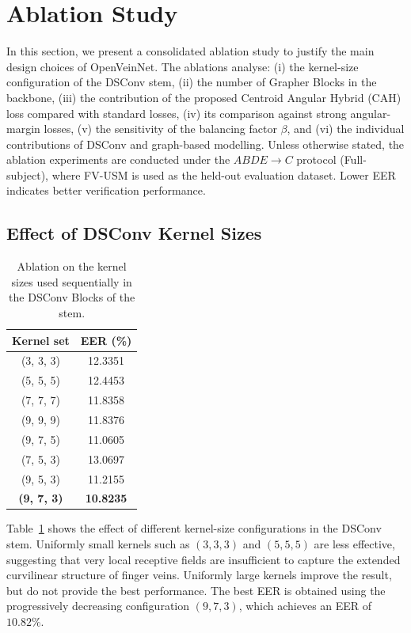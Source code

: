 \documentclass[10pt,journal,compsoc]{IEEEtran}
\begin{document}
\section{Ablation Study}
\label{sec:ablation}

In this section, we present a consolidated ablation study to justify the main design choices of OpenVeinNet. The ablations analyse: (i) the kernel-size configuration of the DSConv stem, (ii) the number of Grapher Blocks in the backbone, (iii) the contribution of the proposed Centroid Angular Hybrid (CAH) loss compared with standard losses, (iv) its comparison against strong angular-margin losses, (v) the sensitivity of the balancing factor $\beta$, and (vi) the individual contributions of DSConv and graph-based modelling. Unless otherwise stated, the ablation experiments are conducted under the $ABDE \rightarrow C$ protocol (Full-subject), where FV-USM is used as the held-out evaluation dataset. Lower EER indicates better verification performance.


\subsection{Effect of DSConv Kernel Sizes}

\begin{table}[ht!]
    \centering
    \begin{tabular}{| c | c |}
        \hline
        Kernel set & EER (\%)  \\
        \hline
        \hline
        (3, 3, 3) & 12.3351 \\
        (5, 5, 5) & 12.4453 \\
        (7, 7, 7) & 11.8358 \\
        (9, 9, 9) & 11.8376 \\
        (9, 7, 5) & 11.0605 \\
        (7, 5, 3) & 13.0697 \\
        (9, 5, 3) & 11.2155 \\
        \textbf{(9, 7, 3)} & \textbf{10.8235} \\
        \hline
    \end{tabular}
    \caption{Ablation on the kernel sizes used sequentially in the DSConv Blocks of the stem.}
    \label{tab:stemexps}
\end{table}

Table~\ref{tab:stemexps} shows the effect of different kernel-size configurations in the DSConv stem. Uniformly small kernels such as $(3,3,3)$ and $(5,5,5)$ are less effective, suggesting that very local receptive fields are insufficient to capture the extended curvilinear structure of finger veins. Uniformly large kernels improve the result, but do not provide the best performance. The best EER is obtained using the progressively decreasing configuration $(9,7,3)$, which achieves an EER of $10.82\%$.
\end{document}
